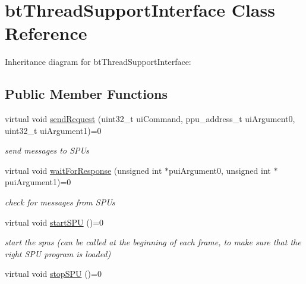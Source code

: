 \hypertarget{classbt_thread_support_interface}{\section{bt\+Thread\+Support\+Interface Class Reference}
\label{classbt_thread_support_interface}
}


Inheritance diagram for bt\+Thread\+Support\+Interface\+:
\subsection*{Public Member Functions}
\begin{DoxyCompactItemize}
\item 
\hypertarget{classbt_thread_support_interface_a2c20a0b41be978c429e0b1a2b2f03152}{virtual void \hyperlink{classbt_thread_support_interface_a2c20a0b41be978c429e0b1a2b2f03152}{send\+Request} (uint32\+\_\+t ui\+Command, ppu\+\_\+address\+\_\+t ui\+Argument0, uint32\+\_\+t ui\+Argument1)=0}\label{classbt_thread_support_interface_a2c20a0b41be978c429e0b1a2b2f03152}

\begin{DoxyCompactList}\small\item\em send messages to S\+P\+Us \end{DoxyCompactList}\item 
\hypertarget{classbt_thread_support_interface_abe3c8fa6998096a4804dbfd28882cfd9}{virtual void \hyperlink{classbt_thread_support_interface_abe3c8fa6998096a4804dbfd28882cfd9}{wait\+For\+Response} (unsigned int $\ast$pui\+Argument0, unsigned int $\ast$pui\+Argument1)=0}\label{classbt_thread_support_interface_abe3c8fa6998096a4804dbfd28882cfd9}

\begin{DoxyCompactList}\small\item\em check for messages from S\+P\+Us \end{DoxyCompactList}\item 
virtual void \hyperlink{classbt_thread_support_interface_a4d5139ae58302c0509c309ba9f3d2ca3}{start\+S\+P\+U} ()=0
\begin{DoxyCompactList}\small\item\em start the spus (can be called at the beginning of each frame, to make sure that the right S\+P\+U program is loaded) \end{DoxyCompactList}\item 
\hypertarget{classbt_thread_support_interface_a708419e843a0ebf0787983bcb50b8a83}{virtual void \hyperlink{classbt_thread_support_interface_a708419e843a0ebf0787983bcb50b8a83}{stop\+S\+P\+U} ()=0}\label{classbt_thread_support_interface_a708419e843a0ebf0787983bcb50b8a83}


\end{DoxyCompactItemize}

